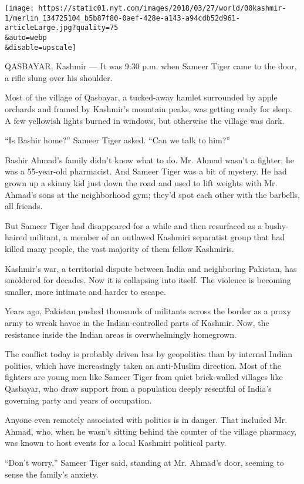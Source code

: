 \texttt{[image: https://static01.nyt.com/images/2018/03/27/world/00kashmir-1/merlin\_134725104\_b5b87f80-0aef-428e-a143-a94cdb52d961-articleLarge.jpg?quality=75\\\&auto=webp\\\&disable=upscale]}

QASBAYAR, Kashmir --- It was 9:30 p.m. when Sameer Tiger came to the
door, a rifle slung over his shoulder.

Most of the village of Qasbayar, a tucked-away hamlet surrounded by
apple orchards and framed by Kashmir's mountain peaks, was getting ready
for sleep. A few yellowish lights burned in windows, but otherwise the
village was dark.

``Is Bashir home?'' Sameer Tiger asked. ``Can we talk to him?''

Bashir Ahmad's family didn't know what to do. Mr. Ahmad wasn't a
fighter; he was a 55-year-old pharmacist. And Sameer Tiger was a bit of
mystery. He had grown up a skinny kid just down the road and used to
lift weights with Mr. Ahmad's sons at the neighborhood gym; they'd spot
each other with the barbells, all friends.

But Sameer Tiger had disappeared for a while and then resurfaced as a
bushy-haired militant, a member of an outlawed Kashmiri separatist group
that had killed many people, the vast majority of them fellow Kashmiris.

Kashmir's war, a territorial dispute between India and neighboring
Pakistan, has smoldered for decades. Now it is collapsing into itself.
The violence is becoming smaller, more intimate and harder to escape.

Years ago, Pakistan pushed thousands of militants across the border as a
proxy army to wreak havoc in the Indian-controlled parts of Kashmir.
Now, the resistance inside the Indian areas is overwhelmingly homegrown.

The conflict today is probably driven less by geopolitics than by
internal Indian politics, which have increasingly taken an anti-Muslim
direction. Most of the fighters are young men like Sameer Tiger from
quiet brick-walled villages like Qasbayar, who draw support from a
population deeply resentful of India's governing party and years of
occupation.

Anyone even remotely associated with politics is in danger. That
included Mr. Ahmad, who, when he wasn't sitting behind the counter of
the village pharmacy, was known to host events for a local Kashmiri
political party.

``Don't worry,'' Sameer Tiger said, standing at Mr. Ahmad's door,
seeming to sense the family's anxiety.

